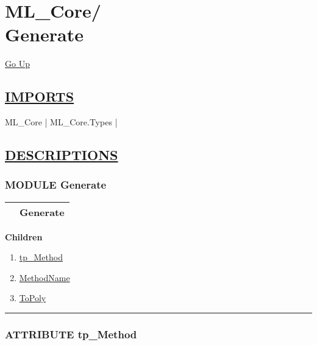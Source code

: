\chapter*{\color{headfile}
{\large ML\_Core\slash\hspace{0pt}}
 \\
Generate
}
\hypertarget{ecldoc:toc:ML_Core.Generate}{}
\hyperlink{ecldoc:toc:root/ML_Core}{Go Up}

\section*{\underline{\textsf{IMPORTS}}}
\begin{doublespace}
{\large
ML\_Core |
ML\_Core.Types |
}
\end{doublespace}

\section*{\underline{\textsf{DESCRIPTIONS}}}
\subsection*{\textsf{\colorbox{headtoc}{\color{white} MODULE}
Generate}}

\hypertarget{ecldoc:ML_Core.Generate}{}

{\renewcommand{\arraystretch}{1.5}
\begin{tabularx}{\textwidth}{|>{\raggedright\arraybackslash}l|X|}
\hline
\hspace{0pt}\mytexttt{\color{red} } & \textbf{Generate} \\
\hline
\end{tabularx}
}

\par


\textbf{Children}
\begin{enumerate}
\item \hyperlink{ecldoc:ecldoc-tp_Method}{tp\_Method}
\item \hyperlink{ecldoc:ml_core.generate.methodname}{MethodName}
\item \hyperlink{ecldoc:ml_core.generate.topoly}{ToPoly}
\end{enumerate}

\rule{\linewidth}{0.5pt}

\subsection*{\textsf{\colorbox{headtoc}{\color{white} ATTRIBUTE}
tp\_Method}}

